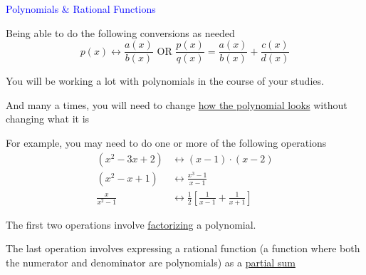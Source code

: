 \documentclass[14pt,fleqn]{extarticle}
\begin{document}
\begin{skill}
\textcolor{blue}{Polynomials \& Rational Functions}

Being able to do the following conversions as needed 
\[ p(x) \leftrightarrow \frac{a(x)}{b(x)}\text{ OR } \frac{p(x)}{q(x)} = \frac{a(x)}{b(x)} + \frac{c(x)}{d(x)} \]

\end{skill}

\newcard 

You will be working a lot with polynomials in the  course of your studies. \newline 

And many a times, you will need to change \underline{how the polynomial looks} without changing what it is \newline 

For example, you may need to do one or more of the following operations 
\begin{align}
	\left(x^2 - 3x + 2 \right) &\longleftrightarrow \left(x-1 \right)\cdot \left(x-2 \right) \\
	\left(x^2-x+1 \right)&\longleftrightarrow \frac{x^3-1}{x-1} \\
	\frac{x}{x^2-1} &\longleftrightarrow \frac{1}{2} \left[\frac{1}{x-1} + \frac{1}{x+1} \right]
\end{align}

The first two operations involve \underline{factorizing} a polynomial. \newline 

The last operation involves expressing a rational function (a function where both the numerator and denominator are polynomials) as a \underline{partial sum}
\end{document}
